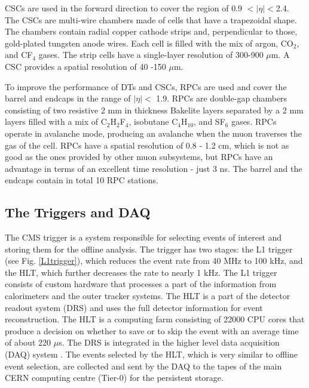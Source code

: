 \begin{normalsize}
CSCs are used in the forward direction to cover the region of 0.9 $ <|\eta|<$2.4. The CSCs are multi-wire chambers made of cells  that have a trapezoidal shape. The chambers contain radial copper cathode strips and, perpendicular to those, gold-plated tungsten anode wires. Each cell is filled with the mix of argon, CO$_2$, and CF$_4$ gases. The strip cells have a single-layer resolution of 300-900 $\mu$m. A CSC  provides a spatial resolution of 40 -150 $\mu$m.


To improve the performance of DTs and CSCs, RPCs are used and cover the barrel and endcaps in the range of $|\eta| <$ 1.9. 
RPCs are double-gap chambers consisting of two resistive 2 mm in thickness Bakelite layers separated by a 2 mm layers filled with a mix of C$_2$H$_2$F$_4$, isobutane C$_4$H$_{10}$, and SF$_6$ gases. RPCs operate in avalanche mode, producing an avalanche when the muon traverses the gas of the cell. RPCs have a spatial resolution of 0.8 - 1.2 cm, which is not as good as the ones provided by other muon subsystems, but RPCs have an advantage in terms of an excellent time resolution - just 3 ns. The barrel and the endcaps contain in total 10 RPC stations.



\subsection{The Triggers and DAQ}

The CMS trigger \cite{Trigger} is a system responsible for selecting events of interest and storing them for the offline analysis. The trigger has two stages: the L1 trigger (see Fig. \ref{L1trigger}), which reduces the event rate from 40 MHz to 100 kHz, and the HLT, which further decreases the rate to nearly 1 kHz. The L1 trigger consists of custom hardware that processes a part of the information from calorimeters and the outer tracker systems. The HLT is a part of the detector readout system (DRS) and uses the full detector information for event reconstruction. The HLT is a computing farm consisting of 22000 CPU cores that produce a decision on whether to save or to skip the event with an average time of about 220 $\mu$s. The DRS is integrated in the higher level data acquisition (DAQ) system \cite{DAQ}. The events selected by the HLT, which is very similar to offline event selection, are collected and sent by the DAQ to the tapes of the main CERN computing centre (Tier-0) for the persistent storage. 


\end{normalsize}
